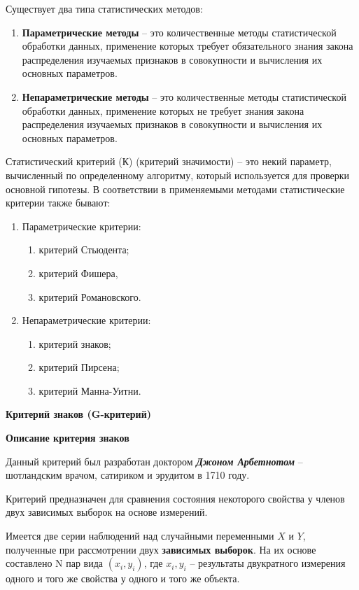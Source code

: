 \documentclass[12pt]{article}
\begin{document}
\medskip
Существует два типа статистических методов:
\begin{enumerate}
    \item \textbf{Параметрические методы} – это количественные методы статистической обработки данных, применение которых требует обязательного знания закона распределения изучаемых признаков в совокупности и вычисления их основных параметров.
    \item \textbf{Непараметрические методы} – это количественные методы статистической обработки данных, применение которых не требует знания закона распределения изучаемых признаков в совокупности и вычисления их основных параметров.
\end{enumerate}
Статистический критерий (К) (критерий значимости) – это некий параметр, вычисленный по определенному алгоритму, который используется для проверки основной гипотезы. В соответствии в применяемыми методами статистические критерии также бывают:
\begin{enumerate}
    \item Параметрические критерии:
    \begin{enumerate}
        \item критерий Стьюдента;
        \item критерий Фишера,
        \item критерий Романовского.
    \end{enumerate}
    \item Непараметрические критерии:
    \begin{enumerate}
        \item критерий знаков;
        \item критерий Пирсена;
        \item критерий Манна-Уитни.
    \end{enumerate}
\end{enumerate}

\textbf{Критерий знаков (G-критерий)}

\medskip
\textbf{Описание критерия знаков}

\medskip
Данный критерий был разработан доктором \textbf{\textit{Джоном Арбетнотом}} – шотландским врачом, сатириком и эрудитом в 1710 году.

Критерий предназначен для сравнения состояния некоторого свойства у членов двух зависимых выборок на основе измерений.

Имеется две серии наблюдений над случайными переменными $X$ и $Y$, полученные при рассмотрении двух \textbf{зависимых выборок}. На их основе составлено N пар вида $(x_i, y_i)$, где $x_i, y_i$ – результаты двукратного измерения одного и того же свойства у одного и того же объекта.
\end{document}
